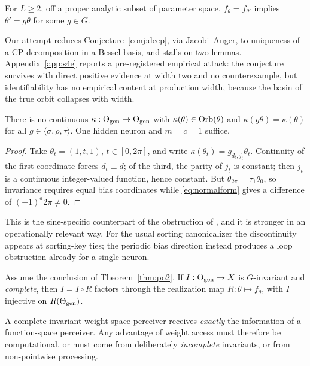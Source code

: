 \begin{conjecture}\label{conj:deep}
For $L\ge2$, off a proper analytic subset of parameter space, $f_\theta = f_{\theta'}$ implies
$\theta' = g\theta$ for some $g\in G$.
\end{conjecture}

Our attempt reduces Conjecture~\ref{conj:deep}, via Jacobi--Anger, to uniqueness of a CP
decomposition in a Bessel basis, and stalls on two lemmas. Appendix~\ref{app:s4e} reports a
pre-registered empirical attack: the conjecture survives with direct positive evidence at width
two and no counterexample, but identifiability has no empirical content at production width,
because the basin of the true orbit collapses with width.

\begin{proposition}\label{prop:po5}
There is no continuous $\kappa : \Theta_{\mathrm{gen}} \to \Theta_{\mathrm{gen}}$ with $\kappa(\theta) \in \operatorname{Orb}(\theta)$ and
$\kappa(g\theta) = \kappa(\theta)$ for all $g \in \langle\sigma,\rho,\tau\rangle$. One hidden neuron
and $m=c=1$ suffice.
\end{proposition}

\begin{proof}
Take $\theta_t = (1,t,1)$, $t\in[0,2\pi]$, and write $\kappa(\theta_t) = g_{d_t,j_t}\theta_t$.
Continuity of the first coordinate forces $d_t \equiv d$; of the third, the parity of $j_t$ is
constant; then $j_t$ is a continuous integer-valued function, hence constant. But
$\theta_{2\pi} = \tau_1\theta_0$, so invariance requires equal bias coordinates while
\eqref{eq:normalform} gives a difference of $(-1)^d 2\pi \neq 0$.
\end{proof}

This is the sine-specific counterpart of the obstruction of \citet{dym2024impossibility}, and it is
stronger in an operationally relevant way. For the usual sorting canonicalizer the discontinuity
appears at sorting-key ties; the periodic bias direction instead produces a loop obstruction
already for a single neuron.

\begin{proposition}\label{prop:po6}
Assume the conclusion of Theorem~\ref{thm:po2}. If $I : \Theta_{\mathrm{gen}} \to X$ is $G$-invariant and
\emph{complete}, then $I = \bar I \circ R$ factors through the realization map
$R:\theta \mapsto f_\theta$, with $\bar I$ injective on $R(\Theta_{\mathrm{gen}})$.
\end{proposition}

\begin{corollary}\label{cor:ceiling}
A complete-invariant weight-space perceiver receives \emph{exactly} the information of a
function-space perceiver. Any advantage of weight access must therefore be computational, or must
come from deliberately \emph{incomplete} invariants, or from non-pointwise processing.
\end{corollary}

